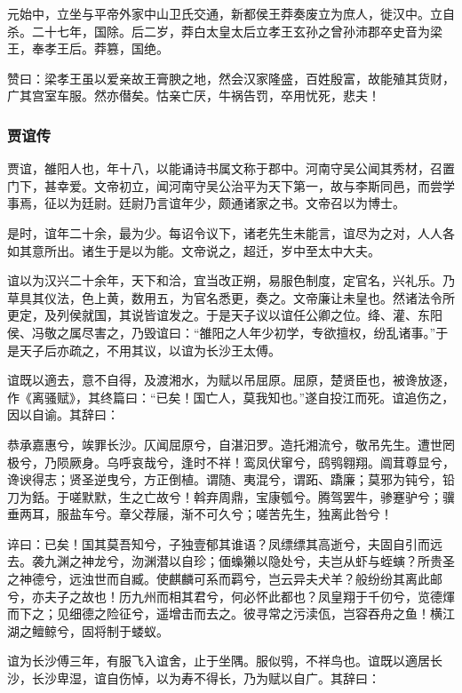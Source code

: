 \documentclass[]{article}
\begin{document}
元始中，立坐与平帝外家中山卫氏交通，新都侯王莽奏废立为庶人，徙汉中。立自杀。二十七年，国除。后二岁，莽白太皇太后立孝王玄孙之曾孙沛郡卒史音为梁王，奉孝王后。莽篡，国绝。

赞曰：梁孝王虽以爱亲故王膏腴之地，然会汉家隆盛，百姓殷富，故能殖其货财，广其宫室车服。然亦僣矣。怙亲亡厌，牛祸告罚，卒用忧死，悲夫！

\hypertarget{header-n4097}{%
\subsubsection{贾谊传}\label{header-n4097}}

贾谊，雒阳人也，年十八，以能诵诗书属文称于郡中。河南守吴公闻其秀材，召置门下，甚幸爱。文帝初立，闻河南守吴公治平为天下第一，故与李斯同邑，而尝学事焉，征以为廷尉。廷尉乃言谊年少，颇通诸家之书。文帝召以为博士。

是时，谊年二十余，最为少。每诏令议下，诸老先生未能言，谊尽为之对，人人各如其意所出。诸生于是以为能。文帝说之，超迁，岁中至太中大夫。

谊以为汉兴二十余年，天下和洽，宜当改正朔，易服色制度，定官名，兴礼乐。乃草具其仪法，色上黄，数用五，为官名悉更，奏之。文帝廉让未皇也。然诸法令所更定，及列侯就国，其说皆谊发之。于是天子议以谊任公卿之位。绛、灌、东阳侯、冯敬之属尽害之，乃毁谊曰：``雒阳之人年少初学，专欲擅权，纷乱诸事。''于是天子后亦疏之，不用其议，以谊为长沙王太傅。

谊既以適去，意不自得，及渡湘水，为赋以吊屈原。屈原，楚贤臣也，被谗放逐，作《离骚赋》，其终篇曰：``已矣！国亡人，莫我知也。''遂自投江而死。谊追伤之，因以自谕。其辞曰：

恭承嘉惠兮，竢罪长沙。仄闻屈原兮，自湛汨罗。造托湘流兮，敬吊先生。遭世罔极兮，乃陨厥身。乌呼哀哉兮，逢时不祥！鸾凤伏窜兮，鸱鸮翱翔。阘茸尊显兮，谗谀得志；贤圣逆曳兮，方正倒植。谓随、夷混兮，谓跖、蹻廉；莫邪为钝兮，铅刀为銛。于嗟默默，生之亡故兮！斡弃周鼎，宝康瓠兮。腾驾罢牛，骖蹇驴兮；骥垂两耳，服盐车兮。章父荐屦，渐不可久兮；嗟苦先生，独离此咎兮！

谇曰：已矣！国其莫吾知兮，子独壹郁其谁语？凤缥缥其高逝兮，夫固自引而远去。袭九渊之神龙兮，沕渊潜以自珍；偭蟂獭以隐处兮，夫岂从虾与蛭螾？所贵圣之神德兮，远浊世而自臧。使麒麟可系而羁兮，岂云异夫犬羊？般纷纷其离此邮兮，亦夫子之故也！历九州而相其君兮，何必怀此都也？凤皇翔于千仞兮，览德煇而下之；见细德之险征兮，遥增击而去之。彼寻常之污渎佤，岂容吞舟之鱼！横江湖之鳣鲸兮，固将制于蝼蚁。

谊为长沙傅三年，有服飞入谊舍，止于坐隅。服似鸮，不祥鸟也。谊既以適居长沙，长沙卑湿，谊自伤悼，以为寿不得长，乃为赋以自广。其辞曰：
\end{document}
